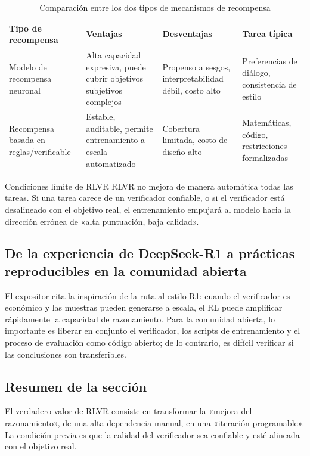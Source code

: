 \begin{table}[H]
\centering
\renewcommand{\arraystretch}{1.2}
\begin{tabular}{p{2.8cm}p{3.6cm}p{3.8cm}p{2.8cm}}
\toprule
\textbf{Tipo de recompensa} & \textbf{Ventajas} & \textbf{Desventajas} & \textbf{Tarea típica} \\
\midrule
Modelo de recompensa neuronal & Alta capacidad expresiva, puede cubrir objetivos subjetivos complejos & Propenso a sesgos, interpretabilidad débil, costo alto & Preferencias de diálogo, consistencia de estilo \\
Recompensa basada en reglas/verificable & Estable, auditable, permite entrenamiento a escala automatizado & Cobertura limitada, costo de diseño alto & Matemáticas, código, restricciones formalizadas \\
\bottomrule
\end{tabular}
\caption{Comparación entre los dos tipos de mecanismos de recompensa}
\end{table}

\begin{warningbox}{Condiciones límite de RLVR}
RLVR no mejora de manera automática todas las tareas. Si una tarea carece de un verificador confiable, o si el verificador está desalineado con el objetivo real, el entrenamiento empujará al modelo hacia la dirección errónea de «alta puntuación, baja calidad».
\end{warningbox}

\subsection{De la experiencia de DeepSeek-R1 a prácticas reproducibles en la comunidad abierta}
El expositor cita la inspiración de la ruta al estilo R1: cuando el verificador es económico y las muestras pueden generarse a escala, el RL puede amplificar rápidamente la capacidad de razonamiento. Para la comunidad abierta, lo importante es liberar en conjunto el verificador, los scripts de entrenamiento y el proceso de evaluación como código abierto; de lo contrario, es difícil verificar si las conclusiones son transferibles.

\subsection{Resumen de la sección}
El verdadero valor de RLVR consiste en transformar la «mejora del razonamiento», de una alta dependencia manual, en una «iteración programable». La condición previa es que la calidad del verificador sea confiable y esté alineada con el objetivo real.

